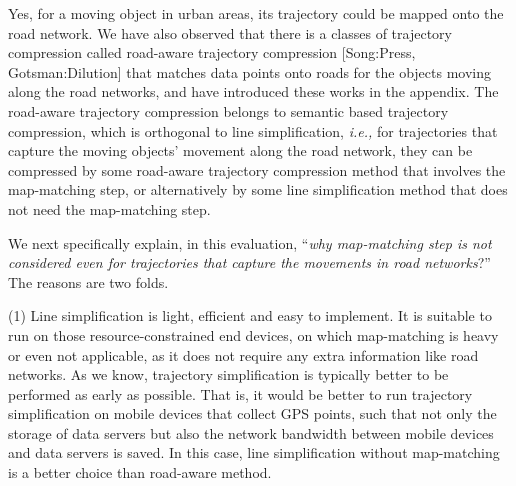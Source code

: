 \documentclass{letter}
\newcommand{\ie}{\emph{i.e.,}\xspace}
\begin{document}
Yes, for a moving object in urban areas, its trajectory could be mapped onto the road network. We have also observed that there is a classes of trajectory compression called road-aware trajectory compression [Song:Press, Gotsman:Dilution] that matches data points onto roads  for the objects moving along the road networks, and  have introduced these works in the appendix. The road-aware trajectory compression belongs to semantic based trajectory compression, which is orthogonal to line simplification, \ie for trajectories that capture the moving objects' movement along the road network, they can be compressed by some road-aware trajectory compression method that involves the map-matching step, or alternatively by some line simplification method that does not need the map-matching step. %


We next specifically explain, in this evaluation, ``\emph{why map-matching step is not considered even for trajectories that capture the movements in road networks}?''
The reasons are two folds.

(1) Line simplification is light, efficient and easy to implement. It is suitable to run on those resource-constrained end devices, on which map-matching is heavy or even not applicable, as it does not require any extra information like road networks. As we know, trajectory simplification is typically better to be performed as early as possible. That is, it would be better to run trajectory simplification on mobile devices that collect GPS points, such that not only the storage of data servers but also the network bandwidth between mobile devices and data servers is saved. In this case, line simplification without map-matching is a better choice than road-aware method.
\end{document}
